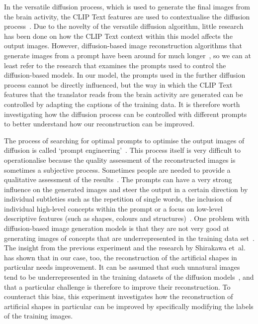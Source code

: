 In the versatile diffusion process, which is used to generate the final images from the  brain activity, the  CLIP Text features are used to contextualise the diffusion process~\cite{ozcelikNaturalSceneReconstruction2023,xuVersatileDiffusionText2024}. Due to the novelty of the versatile diffusion algorithm, little research has been done on how the CLIP Text context within this model affects the output images. However, diffusion-based image reconstruction algorithms that generate images from a prompt have been around for much longer~\cite{rombachHighResolutionImageSynthesis2022,sahariaPhotorealisticTexttoimageDiffusion2022}, so we can at least refer to the research that examines the prompts used to control the diffusion-based models. In our model, the prompts used in the further diffusion process cannot be directly influenced, but the way in which the CLIP Text features that the translator reads from the brain activity are generated can be controlled by adapting the captions of the training data. It is therefore worth investigating how the diffusion process can be controlled with different prompts to better understand how our reconstruction can be improved. 

The process of searching for optimal prompts to optimise the output images of diffusion is called `prompt engineering'~\cite{witteveenInvestigatingPromptEngineering2022}. This process itself is very difficult to operationalise because the quality assessment of the reconstructed images is sometimes a subjective process. Sometimes people are needed to provide a qualitative assessment of the results~\cite{pavlichenkoBestPromptsTexttoImage2023}. The prompts can have a very strong influence on the generated images and steer the output in a certain direction by individual subtleties such as the repetition of single words,  the inclusion of individual high-level concepts within the prompt or a focus on low-level descriptive features (such as shapes, colours and structures)~\cite{witteveenInvestigatingPromptEngineering2022}. One problem with diffusion-based image generation models is that they are not very good at generating images of concepts that are underrepresented in the training data set~\cite{samuelGeneratingImagesRare2024}. The insight from the previous experiment and the research by Shirakawa et\ al.~\cite{shirakawaSpuriousReconstructionBrain2024} has shown that in our case, too, the reconstruction of the artificial shapes in particular needs improvement. It can be assumed that such unnatural images tend to be underrepresented in the training datasets of the diffusion models~\cite{schuhmannLAION400MOpenDataset2021, schuhmannLAION5BOpenLargescale2022}, and that a particular challenge is therefore to improve their reconstruction. To counteract this bias, this experiment investigates how the reconstruction of artificial shapes in particular can be improved by specifically modifying the labels of the training images. 

